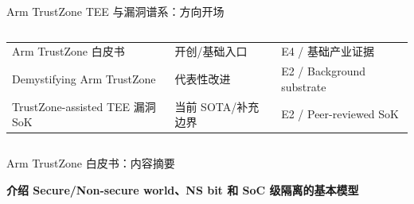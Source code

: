 \begin{frame}[t,shrink=6]{Arm TrustZone TEE 与漏洞谱系：方向开场}
\begin{columns}[T,totalwidth=\textwidth]
\begin{column}{0.49\textwidth}
{\begin{minipage}[t]{0.97\linewidth}
\begin{minipage}{0.92\linewidth}
{\begin{tabularx}{\linewidth}{@{}YYY@{}}
\midrule
Arm TrustZone 白皮书 & 开创/基础入口 & E4 / 基础产业证据 \\
Demystifying Arm TrustZone & 代表性改进 & E2 / Background substrate \\
TrustZone-assisted TEE 漏洞 SoK & 当前 SOTA/补充边界 & E2 / Peer-reviewed SoK \\
\bottomrule
\end{tabularx}
}
    \end{minipage}
    \vspace{1mm}
  \end{minipage}}
  \end{column}
\end{columns}
\end{frame}


\begin{frame}[t,shrink=6]{Arm TrustZone 白皮书：内容摘要}
{\large\bfseries\color{Ink} 介绍 Secure/Non-secure world、NS bit 和 SoC 级隔离的基本模型\par}\vspace{1.2mm}
\begin{columns}[T,totalwidth=\textwidth]
  \begin{column}{0.45\textwidth}
  \end{column}
  \begin{column}{0.49\textwidth}
\end{column}
\end{columns}
\end{frame}
